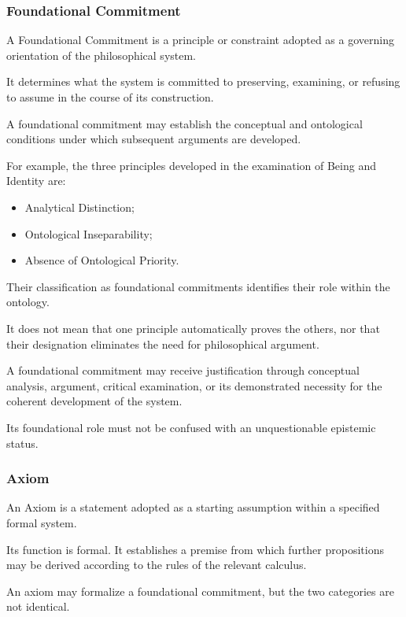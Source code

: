 \subsubsection{Foundational Commitment}

A Foundational Commitment is a principle
or constraint adopted as a governing
orientation of the philosophical
system.

It determines what the system is
committed to preserving, examining,
or refusing to assume in the course
of its construction.

A foundational commitment may
establish the conceptual and
ontological conditions under
which subsequent arguments
are developed.

For example, the three principles
developed in the examination of
Being and Identity are:

\begin{itemize}
    \item Analytical Distinction;
    \item Ontological Inseparability;
    \item Absence of Ontological Priority.
\end{itemize}

Their classification as foundational
commitments identifies their role
within the ontology.

It does not mean that one principle
automatically proves the others,
nor that their designation
eliminates the need for philosophical
argument.

A foundational commitment may
receive justification through
conceptual analysis, argument,
critical examination, or
its demonstrated necessity
for the coherent development
of the system.

Its foundational role must
not be confused with an
unquestionable epistemic status.

\subsubsection{Axiom}

An Axiom is a statement adopted
as a starting assumption within
a specified formal system.

Its function is formal.
It establishes a premise from
which further propositions
may be derived according
to the rules of the relevant
calculus.

An axiom may formalize
a foundational commitment,
but the two categories
are not identical.

